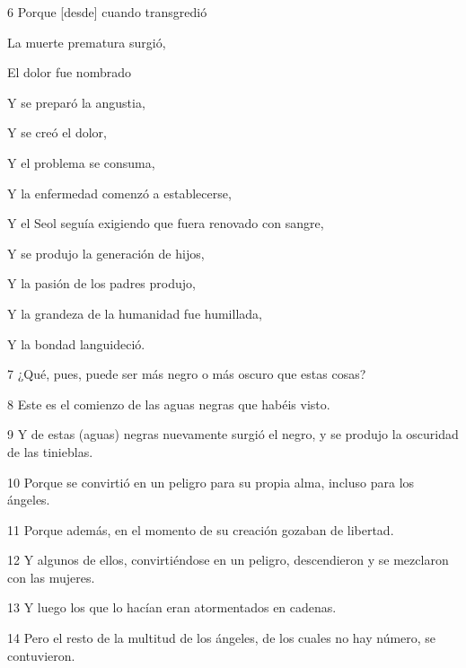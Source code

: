 \par 6 Porque [desde] cuando transgredió

\par La muerte prematura surgió,

\par El dolor fue nombrado

\par Y se preparó la angustia,

\par Y se creó el dolor,

\par Y el problema se consuma,

\par Y la enfermedad comenzó a establecerse,

\par Y el Seol seguía exigiendo que fuera renovado con sangre,

\par Y se produjo la generación de hijos,

\par Y la pasión de los padres produjo,

\par Y la grandeza de la humanidad fue humillada,

\par Y la bondad languideció.

\par 7 ¿Qué, pues, puede ser más negro o más oscuro que estas cosas?

\par 8 Este es el comienzo de las aguas negras que habéis visto.

\par 9 Y de estas (aguas) negras nuevamente surgió el negro, y se produjo la oscuridad de las tinieblas.

\par 10 Porque se convirtió en un peligro para su propia alma, incluso para los ángeles.

\par 11 Porque además, en el momento de su creación gozaban de libertad.

\par 12 Y algunos de ellos, convirtiéndose en un peligro, descendieron y se mezclaron con las mujeres.

\par 13 Y luego los que lo hacían eran atormentados en cadenas.

\par 14 Pero el resto de la multitud de los ángeles, de los cuales no hay número, se contuvieron.

